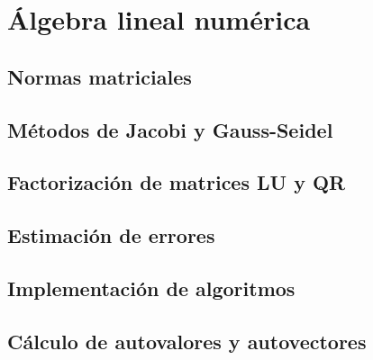 




    
\chapter{Álgebra lineal numérica}
\section{Normas matriciales}
\section{Métodos de Jacobi y Gauss-Seidel}
\section{Factorización de matrices LU y QR}
\section{Estimación de errores}
\section{Implementación de algoritmos}
\section{Cálculo de autovalores y autovectores}
